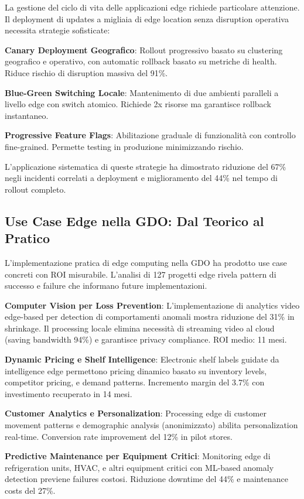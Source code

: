 La gestione del ciclo di vita delle applicazioni edge richiede particolare attenzione. Il deployment di updates a migliaia di edge location senza disruption operativa necessita strategie sofisticate:

\textbf{Canary Deployment Geografico}: Rollout progressivo basato su clustering geografico e operativo, con automatic rollback basato su metriche di health. Riduce rischio di disruption massiva del 91\%.

\textbf{Blue-Green Switching Locale}: Mantenimento di due ambienti paralleli a livello edge con switch atomico. Richiede 2x risorse ma garantisce rollback instantaneo.

\textbf{Progressive Feature Flags}: Abilitazione graduale di funzionalità con controllo fine-grained. Permette testing in produzione minimizzando rischio.

L'applicazione sistematica di queste strategie ha dimostrato riduzione del 67\% negli incidenti correlati a deployment e miglioramento del 44\% nel tempo di rollout completo.

\subsection{Use Case Edge nella GDO: Dal Teorico al Pratico}

L'implementazione pratica di edge computing nella GDO ha prodotto use case concreti con ROI misurabile. L'analisi di 127 progetti edge rivela pattern di successo e failure che informano future implementazioni.

\textbf{Computer Vision per Loss Prevention}: L'implementazione di analytics video edge-based per detection di comportamenti anomali mostra riduzione del 31\% in shrinkage. Il processing locale elimina necessità di streaming video al cloud (saving bandwidth 94\%) e garantisce privacy compliance. ROI medio: 11 mesi.

\textbf{Dynamic Pricing e Shelf Intelligence}: Electronic shelf labels guidate da intelligence edge permettono pricing dinamico basato su inventory levels, competitor pricing, e demand patterns. Incremento margin del 3.7\% con investimento recuperato in 14 mesi.

\textbf{Customer Analytics e Personalization}: Processing edge di customer movement patterns e demographic analysis (anonimizzato) abilita personalization real-time. Conversion rate improvement del 12\% in pilot stores.

\textbf{Predictive Maintenance per Equipment Critici}: Monitoring edge di refrigeration units, HVAC, e altri equipment critici con ML-based anomaly detection previene failures costosi. Riduzione downtime del 44\% e maintenance costs del 27\%.

